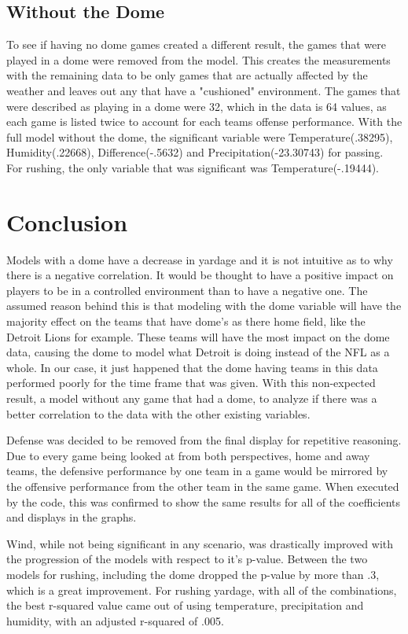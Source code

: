 \documentclass[12pt]{article}
\begin{document}
\subsection{Without the Dome}
\quad To see if having no dome games created a different result, the games that were played in a dome were removed from the model. This creates the measurements with the remaining data to be only games that are actually affected by the weather and leaves out any that have a "cushioned" environment. The games that were described as playing in a dome were 32, which in the data is 64 values, as each game is listed twice to account for each teams offense performance. With the full model without the dome, the significant variable were Temperature(.38295), Humidity(.22668), Difference(-.5632) and Precipitation(-23.30743) for passing. For rushing, the only variable that was significant was Temperature(-.19444).
\section{Conclusion}
\quad Models with a dome have a decrease in yardage and it is not intuitive as to why there is a negative correlation. It would be thought to have a positive impact on players to be in a controlled environment than to have a negative one. The assumed reason behind this is that modeling with the dome variable will have the majority effect on the teams that have dome's as there home field, like the Detroit Lions for example. These teams will have the most impact on the dome data, causing the dome to model what Detroit is doing instead of the NFL as a whole. In our case, it just happened that the dome having teams in this data performed poorly for the time frame that was given. With this non-expected result, a model without any game that had a dome, to analyze if there was a better correlation to the data with the other existing variables.

Defense was decided to be removed from the final display for repetitive reasoning. Due to every game being looked at from both perspectives, home and away teams, the defensive performance by one team in a game would be mirrored by the offensive performance from the other team in the same game. When executed by the code, this was confirmed to show the same results for all of the coefficients and displays in the graphs.

Wind, while not being significant in any scenario, was drastically improved with the progression of the models with respect to it's p-value. Between the two models for rushing, including the dome dropped the p-value by more than .3, which is a great improvement. For rushing yardage, with all of the combinations, the best r-squared value came out of using temperature, precipitation and humidity, with an adjusted r-squared of .005.
\end{document}
